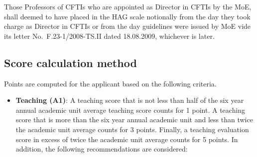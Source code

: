 \documentclass[
  10pt,
  a5paper,
  10pt,
  openany]{amsbook}
\begin{document}
Those Professors of CFTIs who are appointed as Director in CFTIs by the
MoE, shall deemed to have placed in the HAG scale notionally from the
day they took charge as Director in CFTIs or from the day guidelines
were issued by MoE vide its letter No.~F.23-1/2008-TS.II dated
18.08.2009, whichever is later.

\subsection{Score calculation method}\label{score-calculation-method}

Points are computed for the applicant based on the following criteria.

\begin{itemize}
\item
  \textbf{Teaching (A1)}: A teaching score that is not less than half of
  the six year annual academic unit average teaching score counts for 1
  point. A teaching score that is more than the six year annual academic
  unit and less than twice the academic unit average counts for 3
  points. Finally, a teaching evaluation score in excess of twice the
  academic unit average counts for 5 points. In addition, the following
  recommendations are considered:


\end{itemize}
\end{document}
